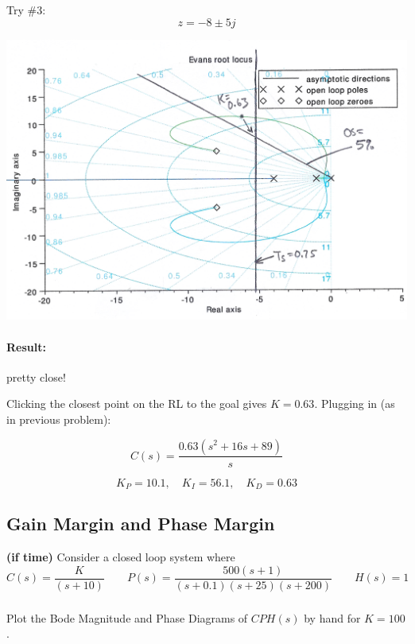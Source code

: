 \documentclass{article}	%
\begin{document}
\begin{solution}
Try \#3:
\[
z = -8\pm5j
\]

\includegraphics[width=145mm]{00959a.png}

\paragraph{Result:}  pretty close!

Clicking the closest point on the RL to the goal gives $K=0.63$.  Plugging in (as in previous problem):

\[
C(s) = \frac{0.63(s^2+16s+89)}{s}
\]

\[
K_P = 10.1,\quad K_I = 56.1, \quad K_D=0.63
\]





\end{solution}




\subsection{Gain Margin and Phase Margin}
{\bf (if time)}  Consider a closed loop system where
\[
C(s) = \frac{K}{(s+10)} \qquad P(s) = \frac{500(s+1)}{(s+0.1)(s+25)(s+200)} \qquad H(s) = 1
\]


\subsubsection{}  Plot the Bode Magnitude and Phase Diagrams of $CPH(s)$ by hand for $K=100$.
\end{document}
